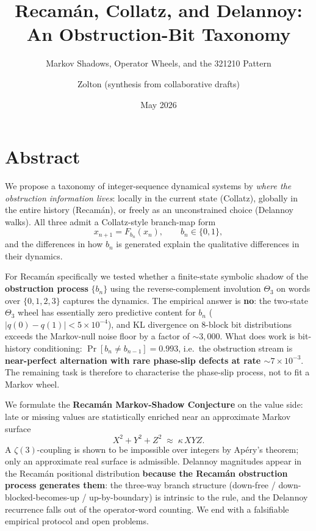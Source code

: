 \documentclass[
  11pt,
]{article}
\title{Recamán, Collatz, and Delannoy: An Obstruction-Bit Taxonomy}
\subtitle{Markov Shadows, Operator Wheels, and the 321210 Pattern}
\author{Zolton (synthesis from collaborative drafts)}
\date{May 2026}
\begin{document}
\maketitle

{
\setcounter{tocdepth}{2}
\tableofcontents
}
\hypertarget{abstract}{%
\section{Abstract}\label{abstract}}

We propose a taxonomy of integer-sequence dynamical systems by
\emph{where the obstruction information lives}: locally in the current
state (Collatz), globally in the entire history (Recamán), or freely as
an unconstrained choice (Delannoy walks). All three admit a
Collatz-style branch-map form \[
x_{n+1} = F_{b_n}(x_n), \qquad b_n \in \{0,1\},
\] and the differences in how \(b_n\) is generated explain the
qualitative differences in their dynamics.

For Recamán specifically we tested whether a finite-state symbolic
shadow of the \textbf{obstruction process} \(\{b_n\}\) using the
reverse-complement involution \(\Theta_3\) on words over \(\{0,1,2,3\}\)
captures the dynamics. The empirical answer is \textbf{no}: the
two-state \(\Theta_3\) wheel has essentially zero predictive content for
\(b_n\) (\(|q(0) - q(1)| < 5 \times 10^{-4}\)), and KL divergence on
\(8\)-block bit distributions exceeds the Markov-null noise floor by a
factor of \(\sim 3{,}000\). What does work is bit-history conditioning:
\(\Pr[b_n \ne b_{n-1}] = 0.993\), i.e.~the obstruction stream is
\textbf{near-perfect alternation with rare phase-slip defects at rate
\(\sim 7 \times 10^{-3}\)}. The remaining task is therefore to
characterise the phase-slip process, not to fit a Markov wheel.

We formulate the \textbf{Recamán Markov-Shadow Conjecture} on the value
side: late or missing values are statistically enriched near an
approximate Markov surface \[
X^2 + Y^2 + Z^2 \;\approx\; \kappa\, XYZ.
\] A \(\zeta(3)\)-coupling is shown to be impossible over integers by
Apéry's theorem; only an approximate real surface is admissible.
Delannoy magnitudes appear in the Recamán positional distribution
\textbf{because the Recamán obstruction process generates them}: the
three-way branch structure (down-free / down-blocked-becomes-up /
up-by-boundary) is intrinsic to the rule, and the Delannoy recurrence
falls out of the operator-word counting. We end with a falsifiable
empirical protocol and open problems.
\end{document}
